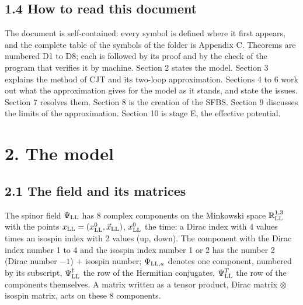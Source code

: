 \documentclass[
  10pt,
]{article}
\begin{document}
\hypertarget{how-to-read-this-document}{%
\subsection{1.4 How to read this
document}\label{how-to-read-this-document}}

The document is self-contained: every symbol is defined where it first
appears, and the complete table of the symbols of the folder is Appendix
C. Theorems are numbered D1 to D8; each is followed by its proof and by
the check of the program that verifies it by machine. Section 2 states
the model. Section 3 explains the method of CJT and its two-loop
approximation. Sections 4 to 6 work out what the approximation gives for
the model as it stands, and state the issues. Section 7 resolves them.
Section 8 is the creation of the SFBS. Section 9 discusses the limits of
the approximation. Section 10 is stage E, the effective potential.

\hypertarget{the-model}{%
\section{2. The model}\label{the-model}}

\hypertarget{the-field-and-its-matrices}{%
\subsection{2.1 The field and its
matrices}\label{the-field-and-its-matrices}}

The spinor field \(\Psi_{\rm LL}\) has 8 complex components on the
Minkowski space \(\mathbb R^{1,3}_{\rm LL}\) with the points
\(x_{\rm LL}=(x^0_{\rm LL},\vec x_{\rm LL})\), \(x^0_{\rm LL}\) the
time: a Dirac index with 4 values times an isospin index with 2 values
(up, down). The component with the Dirac index number 1 to 4 and the
isospin index number 1 or 2 has the number 2 (Dirac number \(-1\)) \(+\)
isospin number; \(\Psi_{{\rm LL},a}\) denotes one component, numbered by
its subscript, \(\Psi^\dagger_{\rm LL}\) the row of the Hermitian
conjugates, \(\Psi^T_{\rm LL}\) the row of the components themselves. A
matrix written as a tensor product, Dirac matrix \(\otimes\) isospin
matrix, acts on these 8 components.
\end{document}
